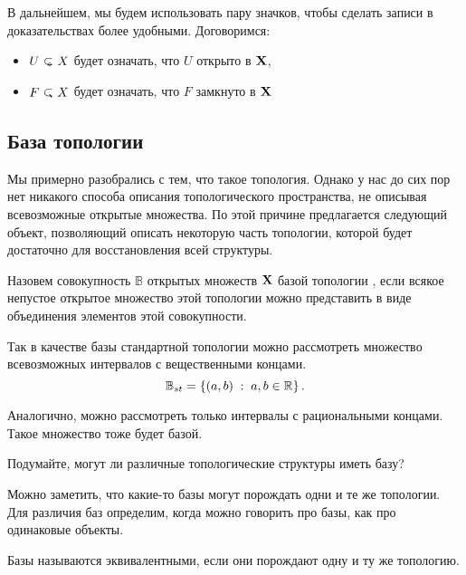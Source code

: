 \begin{Note}
    В дальнейшем, мы будем использовать пару значков, чтобы сделать записи в доказательствах более удобными. Договоримся:
    \begin{itemize}
        \item $U \open X$ будет означать, что $U$ открыто в $\mathbf{X}$,
        \item $F \closed X$ будет означать, что $F$ замкнуто в $\mathbf{X}$
    \end{itemize}
\end{Note}

\subsection{База топологии}
Мы примерно разобрались с тем, что такое топология. Однако у нас до сих пор нет никакого способа описания топологического пространства, не описывая всевозможные открытые множества. По этой причине предлагается следующий объект, позволяющий описать некоторую часть топологии, которой будет достаточно для восстановления всей структуры.
\begin{Def}
    Назовем совокупность $\mathbb{B}$ открытых множеств $\mathbf{X}$ базой топологии \topX, если всякое непустое открытое множество этой топологии можно представить в виде объединения элементов этой совокупности.
\end{Def}
\begin{Ex}
    Так в качестве базы стандартной топологии можно рассмотреть множество всевозможных интервалов с вещественными концами. 
    \[
        \mathbb{B}_{st} = \left\{ (a, b) \; : \; a,b \in \mathbb{R} \right\}.
    \] 

    Аналогично, можно рассмотреть только интервалы с рациональными концами. Такое множество тоже будет базой.
\end{Ex}

\begin{Task}
    Подумайте, могут ли различные топологические структуры иметь базу?
\end{Task}

Можно заметить, что какие-то базы могут порождать одни и те же топологии. Для различия баз определим, когда можно говорить про базы, как про одинаковые объекты.
\begin{Def}
    Базы называются эквивалентными, если они порождают одну и ту же топологию.
\end{Def}

